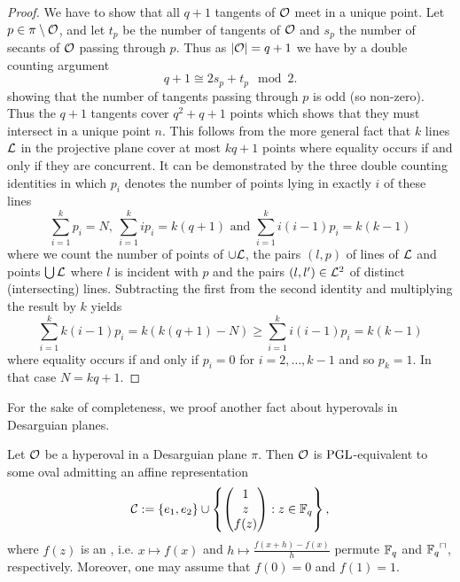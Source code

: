 \begin{proof}
    We have to show that all $q+1$ tangents of $\mathcal{O}$ meet in a unique point. Let $p\in\pi\setminus\mathcal{O}$, and let $t_p$ be the number of tangents of $\mathcal{O}$ and $s_p$ the number of secants of $\mathcal{O}$ passing through $p$. Thus as $\left\vert{\mathcal{O}}\right\vert=q+1$ we have by a double counting argument
    $$
    q+1 \cong 2s_p+t_p \mod 2.
    $$
    showing that the number of tangents passing through $p$ is odd (so non-zero). Thus the $q+1$ tangents cover $q^2+q+1$ points which shows that they must intersect in a unique point $n$. This follows from the more general fact that $k$ lines $\mathcal{L}$ in the projective plane cover at most $kq+1$ points where equality occurs if and only if they are concurrent. It can be demonstrated by the three double counting identities in which $p_i$ denotes the number of points lying in exactly $i$ of these lines
    $$
    \sum_{i=1}^k{p_i}=N,\
    \sum_{i=1}^k{ip_i}=k(q+1)\textrm{ and }\sum_{i=1}^k{i(i-1)p_i}=k(k-1)
    $$
    where we count the number of points of $\cup\mathcal{L}$, the pairs $(l,p)$ of lines of $\mathcal{L}$ and points $\bigcup\mathcal{L}$ where $l$ is incident with $p$ and the pairs $(l,l')\in\mathcal{L}^2$ of distinct (intersecting) lines.
    Subtracting the first from the second identity and multiplying the result by $k$ yields
    $$
    \sum_{i=1}^k{k(i-1)p_i}=k(k(q+1)-N)\geq \sum_{i=1}^k{i(i-1)p_i}=k(k-1)
    $$
    where equality occurs if and only if $p_i=0$ for $i=2,\ldots,k-1$ and so $p_k=1$. In that case $N=kq+1$.
\end{proof}%

For the sake of completeness, we proof another fact about hyperovals in Desarguian planes.

\begin{lemma}
    Let $\mathcal{O}$ be a hyperoval in a Desarguian plane $\pi$. Then $\mathcal{O}$ is $\mathrm{PGL}$-equivalent to some oval admitting an affine representation
    $$
    \cC:=\set{e_1,e_2}\setjoin\set{\begin{pmatrix} 1\\ z\\ f(z)\end{pmatrix}}[z\in\field{q}],
    $$
    where $f(z)$ is an , i.e. $x\mapsto f(x)$ and $h\mapsto\frac{f(x+h)-f(x)}{h}$ permute $\mathbb{F}_{q}$ and $\units{\field{q}}$, respectively.
    Moreover, one may assume that $f(0)=0$ and $f(1)=1$.
\end{lemma}

